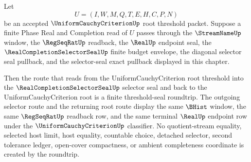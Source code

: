 \begin{theorem}
\label{thm:uniform-cauchy-criterion-root-threshold-seal-roundtrip}
Let
$$
U=(I,W,M,Q,T,E,H,C,P,N)
$$
be an accepted $\UniformCauchyCriterionUp$ root threshold packet. Suppose a finite Phase Real and Completion read of $U$ passes through the $\StreamNameUp$ window, the $\RegSeqRatUp$ readback, the $\RealUp$ endpoint seal, the $\RealCompletionSelectorSealUp$ finite budget envelope, the diagonal selector seal pullback, and the selector-seal exact pullback displayed in this chapter.

Then the route that reads from the UniformCauchyCriterion root threshold into the $\RealCompletionSelectorSealUp$ selector seal and back to the UniformCauchyCriterion root is a finite threshold-seal roundtrip. The outgoing selector route and the returning root route display the same $\BHist$ window, the same $\RegSeqRatUp$ readback row, and the same terminal $\RealUp$ endpoint row under the $\UniformCauchyCriterionUp$ classifier. No quotient-stream equality, selected host limit, host equality, countable choice, detached selector, second tolerance ledger, open-cover compactness, or ambient completeness coordinate is created by the roundtrip.
\end{theorem}
